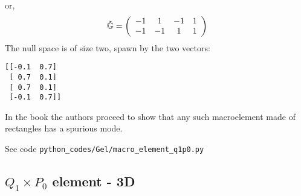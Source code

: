 or, 
\[
\tilde{{\mathbb{G}}} = 
\left(
\begin{array}{cccc}
 -1  &   1 &  -1 &   1  \\ 
 -1  &  -1 &   1 &   1  
\end{array}
\right)
\]
The null space is of size two, spawn by the two vectors:
\begin{verbatim}
[[-0.1  0.7]
 [ 0.7  0.1]
 [ 0.7  0.1]
 [-0.1  0.7]]
\end{verbatim}

In the book the authors proceed to show that any such macroelement 
made of rectangles has a spurious mode. 

See code {\tt python\_codes/Gel/macro\_element\_q1p0.py}

\subsection{$Q_1\times P_0$ element - 3D}

